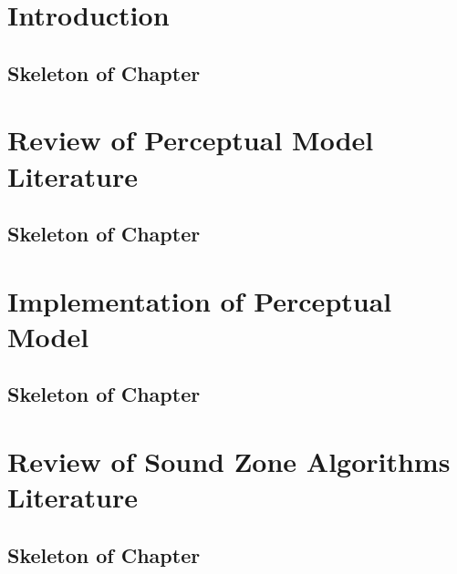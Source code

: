 \documentclass[11pt,twoside,openright,titlepage]{ce}
\begin{document}
\frontmatter
\makecover
\maketitle
\makesignature


\tableofcontents
\listoffigures
\listoftables
\mainmatter

\chapter{Introduction}
\label{sec:introduction}
\begin{tcolorbox}
\section*{Skeleton of Chapter}

\end{tcolorbox}
\newpage

\chapter{Review of Perceptual Model Literature}
\label{sec:literature_review_perceptual_models}
\begin{tcolorbox}
\section*{Skeleton of Chapter}

\end{tcolorbox}
\newpage
% 

\chapter{Implementation of Perceptual Model}
\label{sec:perceptual_models}
\begin{tcolorbox}
\section*{Skeleton of Chapter}

\end{tcolorbox}
\newpage
% 

\chapter{Review of Sound Zone Algorithms Literature}
\label{sec:literature_review_sound_zones}
\begin{tcolorbox}
\section*{Skeleton of Chapter}

\end{tcolorbox}
\newpage
% 
\end{document}
